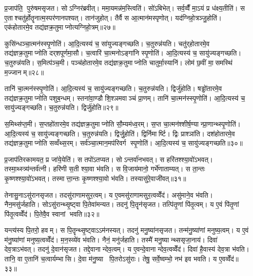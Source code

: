 प्र॒जाप॑ति॒ पुरु॑षमसृजत। सोऽग्निर॑ब्रवीत्। ममा॒यमन्न॑म॒स्त्विति॑। सो॑ऽबिभेत्। सर्व॒व्वैँ मा॒ऽयं प्र ध॑क्ष्य॒तीति॑। स ए॒ताश्चतु॑र्\mbox{}होतॄनात्म॒स्पर॑णानपश्यत्। तान॑जुहोत्। तैर्वै स आ॒त्मान॑मस्पृणोत्। यद॑ग्निहो॒त्रञ्जु॒होति॑। एक॑होतारमे॒व तद्य॑ज्ञक्र॒तुमाप्नोत्यग्निहो॒त्रम्॥२७॥

कुसि॑न्धञ्चा॒त्मन॑स्स्पृ॒णोति॑। आ॒दि॒त्यस्य॑ च॒ सा॑युज्यङ्गच्छति। च॒तुरुन्न॑यति। चतु॑र्‌होतारमे॒व तद्य॑ज्ञक्र॒तुमाप्नोति दर्‌शपूर्णमा॒सौ। च॒त्वारि॑ चा॒त्मनोऽङ्गा॑नि स्पृ॒णोति॑। आ॒दि॒त्यस्य॑ च॒ सायु॑ज्यङ्गच्छति। च॒तुरुन्न॑यति। स॒मित्प॑ञ्च॒मी। पञ्च॑होतारमे॒व तद्य॑ज्ञक्र॒तुमाप्नोति चातुर्मा॒स्यानि॑। लोम॑ छ॒वीं मा॒समस्थि॑ म॒ज्जानम्॥२८॥

तानि॑ चा॒त्मन॑स्स्पृ॒णोति॑। आ॒दि॒त्यस्य॑ च॒ सायु॑ज्यङ्गच्छति। च॒तुरुन्न॑यति। द्विर्जु॑होति। षड्ढो॑तारमे॒व तद्य॑ज्ञक्र॒तुमाप्नोति पशुब॒न्धम्। स्तना॑वा॒ण्डौ शि॒श्ञमवाञ्चं प्रा॒णम्। तानि॑ चा॒त्मन॑स्स्पृ॒णोति॑। आ॒दि॒त्यस्य॑ च॒ सायु॑ज्यङ्गच्छति। च॒तुरुन्न॑यति। द्विर्जु॑होति॥२९॥

स॒मिथ्स॑प्त॒मी। स॒प्तहो॑तारमे॒व तद्य॑ज्ञक्र॒तुमाप्नोति सौ॒म्यम॑ध्व॒रम्। स॒प्त चा॒त्मन॑श्शीर्\mbox{}ष॒ण्यान्प्रा॒णान्थ्स्पृ॒णोति॑। आ॒दि॒त्यस्य॑ च॒ सायु॑ज्यङ्गच्छति। च॒तुरुन्न॑यति। द्विर्जु॒होति॑। द्विर्निमार्ष्टि। द्विः प्राश्ञा॑ति। दश॑होतारमे॒व तद्य॑ज्ञक्र॒तुमाप्नोति सव्वँथ्स॒रम्। सर्व॑ञ्चा॒त्मान॒मप॑रिवर्ग स्पृ॒णोति॑। आ॒दि॒त्यस्य॑ च॒ सायु॑ज्यङ्गच्छति॥३०॥\anuvakamend[अ॒ग्नि॒हो॒त्रं म॒ज्जान॒न्द्विर्जु॑हो॒त्यप॑रिवर्ग स्पृ॒णोत्येक॑ञ्च]

प्र॒जाप॑तिरकामयत॒ प्र जा॑ये॒येति॑। स तपो॑ऽतप्यत। सोऽन्तर्वा॑नभवत्। स हरि॑तश्श्या॒वो॑ऽभवत्। तस्मा॒थ्स्त्र्य॑न्तर्व॑त्नी। हरि॑णी स॒ती श्या॒वा भ॑वति। स वि॒जाय॑मानो॒ गर्भे॑णाताम्यत्। स ता॒न्तः कृ॒ष्णश्श्या॒वो॑ऽभवत्। तस्मात्ता॒न्तः कृ॒ष्णश्श्या॒वो भ॑वति। तस्यासु॑रे॒वाजी॑वत्॥३१॥

तेनासु॒नाऽसु॑रानसृजत। तदसु॑राणामसुर॒त्वम्। य ए॒वमसु॑राणामसुर॒त्वव्वेँद॑। असु॑माने॒व भ॑वति। नैन॒मसु॑र्जहाति। सोऽसु॑रान्थ्सृ॒ष्ट्वा पि॒तेवा॑मन्यत। तदनु॑ पि॒तॄन॑सृजत। तत्पि॑तृ॒णां पि॑तृ॒त्वम्। य ए॒वं पि॑तृ॒णां पि॑तृ॒त्वव्वेँद॑। पि॒तेवै॒व स्वानां भवति॥३२॥

यन्त्य॑स्य पि॒तरो॒ हवम्। स पि॒तॄन्थ्सृ॒ष्ट्वाऽऽम॑नस्यत्। तदनु॑ मनु॒ष्या॑नसृजत। तन्म॑नु॒ष्या॑णां मनुष्य॒त्वम्। य ए॒वं म॑नु॒ष्या॑णां मनुष्य॒त्वव्वेँद॑। म॒न॒स्व्ये॑व भ॑वति। नैनं॒ मनु॑र्जहाति। तस्मै॑ मनु॒ष्यान्थ्ससृजा॒नाय॑। दिवा॑ देव॒त्राऽभ॑वत्। तदनु॑ दे॒वान॑सृजत। तद्दे॒वानान्देव॒त्वम्। य ए॒वन्दे॒वानान्देव॒त्वव्वेँद॑। दिवा॑ है॒वास्य॑ देव॒त्रा भ॑वति। तानि॒ वा ए॒तानि॑ च॒त्वार्यम्भासि। दे॒वा म॑नु॒ष्या पि॒तरोऽसु॑राः। तेषु॒ सर्वे॒ष्वम्भो॒ नभ॑ इव भवति। य ए॒वव्वेँद॑॥३३॥\anuvakamend[अ॒जी॒व॒थ्स्वानां भवति दे॒वान॑सृजत स॒प्त च॑]

